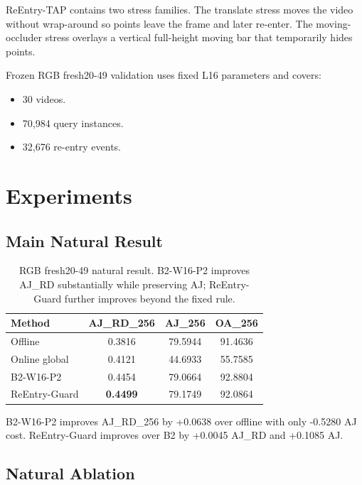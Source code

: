\documentclass[10pt,twocolumn]{article}
\begin{document}
ReEntry-TAP contains two stress families. The translate stress moves the video without wrap-around so points leave the frame and later re-enter. The moving-occluder stress overlays a vertical full-height moving bar that temporarily hides points.

Frozen RGB fresh20-49 validation uses fixed L16 parameters and covers:
\begin{itemize}
    \item 30 videos.
    \item 70,984 query instances.
    \item 32,676 re-entry events.
\end{itemize}

\section{Experiments}

\subsection{Main Natural Result}

\begin{table}[h]
\centering
\small
\begin{tabular}{lccc}
\toprule
Method & AJ\_RD\_256 & AJ\_256 & OA\_256 \\
\midrule
Offline & 0.3816 & 79.5944 & 91.4636 \\
Online global & 0.4121 & 44.6933 & 55.7585 \\
B2-W16-P2 & 0.4454 & 79.0664 & 92.8804 \\
ReEntry-Guard & \textbf{0.4499} & 79.1749 & 92.0864 \\
\bottomrule
\end{tabular}
\caption{RGB fresh20-49 natural result. B2-W16-P2 improves AJ\_RD substantially while preserving AJ; ReEntry-Guard further improves beyond the fixed rule.}
\label{tab:natural}
\end{table}

B2-W16-P2 improves AJ\_RD\_256 by +0.0638 over offline with only -0.5280 AJ cost. ReEntry-Guard improves over B2 by +0.0045 AJ\_RD and +0.1085 AJ.

\subsection{Natural Ablation}
\end{document}
